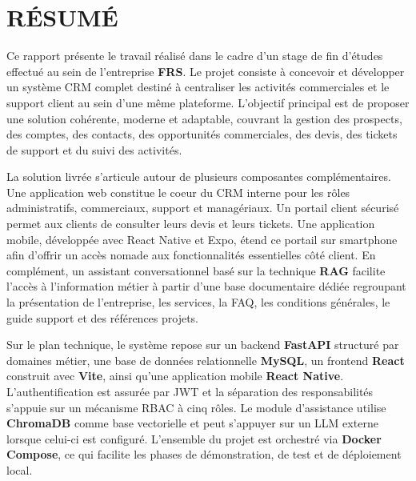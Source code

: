 \chapter*{RÉSUMÉ}
\thispagestyle{MyStyle}

Ce rapport présente le travail réalisé dans le cadre d'un stage de fin d'études effectué au sein de l'entreprise \textbf{FRS}. Le projet consiste à concevoir et développer un système CRM complet destiné à centraliser les activités commerciales et le support client au sein d'une même plateforme. L'objectif principal est de proposer une solution cohérente, moderne et adaptable, couvrant la gestion des prospects, des comptes, des contacts, des opportunités commerciales, des devis, des tickets de support et du suivi des activités.\par
\vspace{0.3cm}

La solution livrée s'articule autour de plusieurs composantes complémentaires. Une application web constitue le coeur du CRM interne pour les rôles administratifs, commerciaux, support et managériaux. Un portail client sécurisé permet aux clients de consulter leurs devis et leurs tickets. Une application mobile, développée avec React Native et Expo, étend ce portail sur smartphone afin d'offrir un accès nomade aux fonctionnalités essentielles côté client. En complément, un assistant conversationnel basé sur la technique \textbf{RAG} facilite l'accès à l'information métier à partir d'une base documentaire dédiée regroupant la présentation de l'entreprise, les services, la FAQ, les conditions générales, le guide support et des références projets.\par
\vspace{0.3cm}

Sur le plan technique, le système repose sur un backend \textbf{FastAPI} structuré par domaines métier, une base de données relationnelle \textbf{MySQL}, un frontend \textbf{React} construit avec \textbf{Vite}, ainsi qu'une application mobile \textbf{React Native}. L'authentification est assurée par JWT et la séparation des responsabilités s'appuie sur un mécanisme RBAC à cinq rôles. Le module d'assistance utilise \textbf{ChromaDB} comme base vectorielle et peut s'appuyer sur un LLM externe lorsque celui-ci est configuré. L'ensemble du projet est orchestré via \textbf{Docker Compose}, ce qui facilite les phases de démonstration, de test et de déploiement local.\par
\vspace{0.3cm}


